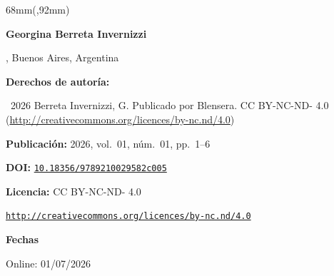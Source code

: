 \documentclass{article}
\newlength{\gbbloquex}
\begin{document}
\begin{textblock*}{68mm}(\gbbloquex,92mm)
{\setlength{\leftskip}{0pt}\setlength{\parindent}{0pt}%
\noindent\begin{minipage}[t]{68mm}
\sffamily\small\setlength{\parskip}{1pt}
{\bfseries\color{azulrevista}Georgina Berreta Invernizzi}\par
, Buenos Aires, Argentina\par
\vspace{6pt}
{\bfseries\color{azulrevista!70}Derechos de autor\'ia:}\par
\textcopyright\ 2026 Berreta Invernizzi, G. Publicado por Blensera. CC BY-NC-ND- 4.0 (\href{http://creativecommons.org/licences/by-nc.nd/4.0}{http://creativecommons.org/licences/by-nc.nd/4.0})\par\vspace{6pt}
{\bfseries\color{azulrevista!70}Publicación:} 2026, vol.~01, n\'um.~01, pp.~1--6\par\vspace{6pt}
{\bfseries\color{azulrevista!70}DOI:} {\scriptsize\texttt{\href{https://doi.org/10.18356/9789210029582c005}{10.18356/9789210029582c005}}}\par\vspace{6pt}
{\bfseries\color{azulrevista!70}Licencia:} CC BY-NC-ND- 4.0\par
{\scriptsize\texttt{\href{http://creativecommons.org/licences/by-nc.nd/4.0}{http://creativecommons.org/licences/by-nc.nd/4.0}}}\par
\vspace{6pt}
{\bfseries\color{azulrevista!70}Fechas}\par\vspace{2pt}
Online: 01/07/2026\par
\vspace{6pt}
\end{minipage}%
}%
\end{textblock*}
\end{document}
